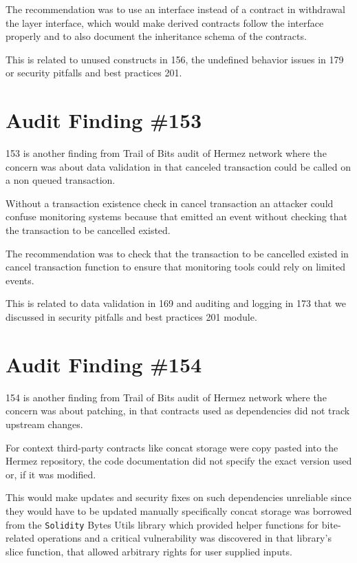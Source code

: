The recommendation was to use an interface instead of a contract in withdrawal the layer interface, which would make derived contracts follow the interface properly and to also document the inheritance schema of the contracts.

This is related to unused constructs in 156, the undefined behavior issues in 179 or security pitfalls and best practices 201.

\section{Audit Finding \#153}

153 is another finding from Trail of Bits audit of Hermez network where the concern was about data validation in that canceled transaction could be called on a non queued transaction. 

Without a transaction existence check in cancel transaction an attacker could confuse monitoring systems because that emitted an event without checking that the transaction to be cancelled existed.

The recommendation was to check that the transaction to be cancelled existed in cancel transaction function to ensure that monitoring tools could rely on limited events.

This is related to data validation in 169 and auditing and logging in 173 that we discussed in security pitfalls and best practices 201 module.

\section{Audit Finding \#154}

154 is another finding from Trail of Bits audit of Hermez network where the concern was about patching, in that contracts used as dependencies did not track upstream changes. 

For context third-party contracts like concat storage were copy pasted into the Hermez repository, the code documentation did not specify the exact version used or, if it was modified. 

This would make updates and security fixes on such dependencies unreliable since they would have to be updated manually specifically concat storage was borrowed from the \verb|Solidity| Bytes Utils library which provided helper functions for bite-related operations and a critical vulnerability was discovered in that library's slice function, that allowed arbitrary rights for user supplied inputs.

